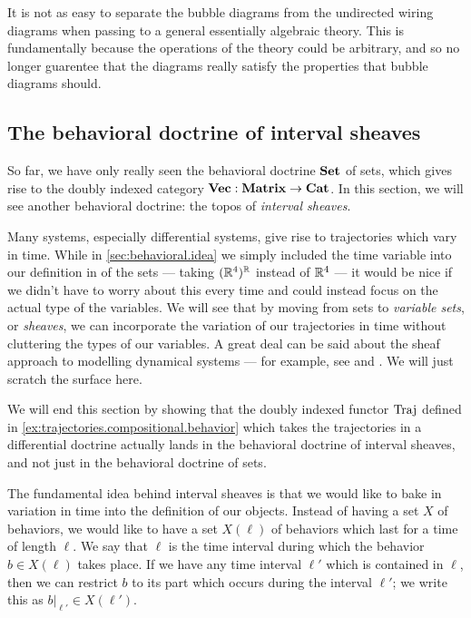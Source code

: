\documentclass[DynamicalBook]{subfiles}
\begin{document}
          \begin{remark}
            It is not as easy to separate the bubble diagrams from the undirected wiring diagrams when passing to a general essentially algebraic theory. This is fundamentally because the operations of the theory could be arbitrary, and so no longer guarentee that the diagrams really satisfy the properties that bubble diagrams should.
          \end{remark}



\subsection{The behavioral doctrine of interval sheaves}\label{sec:behavioral.types}

So far, we have only really seen the behavioral doctrine $\textbf{Set}$ of sets, which gives rise to the doubly indexed category $\textbf{Vec} : \textbf{Matrix} \to \textbf{Cat}$. In this section, we will see another behavioral doctrine: the topos of \emph{interval sheaves}.

Many systems, especially differential systems, give rise to trajectories which vary in time. While in \cref{sec:behavioral.idea} we simply included the time variable into our definition in of the sets --- taking $(\mathbb{R}^{4})^{\mathbb{R}}$ instead of $\mathbb{R}^{4}$ --- it would be nice if we didn't have to worry about this every time and could instead focus on the actual type of the variables. We will see that by moving from sets to \emph{variable sets}, or \emph{sheaves}, we can incorporate the variation of our trajectories in time without cluttering the types of our variables.
A great deal can be said about the sheaf approach to modelling dynamical systems --- for example, see \cite{schultz2016dynamical} and \cite{schultz2019temporal}. We will just scratch the surface here.

We will end this section by showing that the doubly indexed functor $\mathrm{Traj}$ defined in \cref{ex:trajectories.compositional.behavior} which takes the trajectories in a differential doctrine actually lands in the behavioral doctrine of interval sheaves, and not just in the behavioral doctrine of sets.

The fundamental idea behind interval sheaves is that we would like to bake in variation in time into the definition of our objects. Instead of having a set $X$ of behaviors, we would like to have a set $X(\ell)$ of behaviors which last for a time of length $\ell$.  We say that $\ell$ is the time interval during which the behavior $b \in X(\ell)$ takes place. If we have any time interval $\ell'$ which is contained in $\ell$, then we can restrict $b$ to its part which occurs during the interval $\ell'$; we write this as $b|_{\ell'} \in X(\ell')$.
\end{document}

